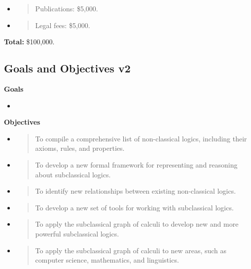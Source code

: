 \begin{itemize}
\item
  \begin{quote}
  Publications: \$5,000.
  \end{quote}
\item
  \begin{quote}
  Legal fees: \$5,000.
  \end{quote}
\end{itemize}

\textbf{Total:} \$100,000.

\hypertarget{goals-and-objectives-v2}{%
\subsection{Goals and Objectives v2}\label{goals-and-objectives-v2}}

\textbf{Goals}

\begin{itemize}
\tightlist
\item
\end{itemize}

\textbf{Objectives}

\begin{itemize}
\item
  \begin{quote}
  To compile a comprehensive list of non-classical logics, including
  their axioms, rules, and properties.
  \end{quote}
\item
  \begin{quote}
  To develop a new formal framework for representing and reasoning about
  subclassical logics.
  \end{quote}
\item
  \begin{quote}
  To identify new relationships between existing non-classical logics.
  \end{quote}
\item
  \begin{quote}
  To develop a new set of tools for working with subclassical logics.
  \end{quote}
\item
  \begin{quote}
  To apply the subclassical graph of calculi to develop new and more
  powerful subclassical logics.
  \end{quote}
\item
  \begin{quote}
  To apply the subclassical graph of calculi to new areas, such as
  computer science, mathematics, and linguistics.
  \end{quote}
\end{itemize}

